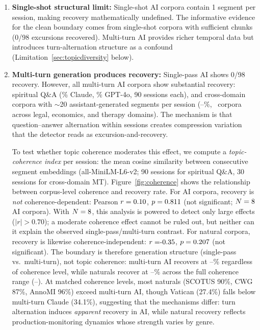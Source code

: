 \documentclass[11pt]{article}
\begin{document}
\begin{enumerate}

\item \textbf{Single-shot structural limit:} Single-shot AI corpora contain 1 segment per session, making recovery mathematically undefined. The informative evidence for the clean boundary comes from single-shot corpora with sufficient chunks (0/98 excursions recovered). Multi-turn AI provides richer temporal data but introduces turn-alternation structure as a confound (Limitation~\ref{sec:topicdiversity} below).

\item \textbf{Multi-turn generation produces recovery:} \label{sec:topicdiversity} Single-pass AI shows 0/98 recovery. However, all multi-turn AI corpora show substantial recovery: spiritual Q\&A (\recClaudeMT\% Claude, \recGPTMT\% GPT-4o, 90 sessions each), and cross-domain corpora with $\sim$20 assistant-generated segments per session (\recMTXdomMin--\recMTXdomMax\%, \nMTXdom\ corpora across legal, economics, and therapy domains). The mechanism is that question--answer alternation within sessions creates compression variation that the detector reads as excursion-and-recovery.

\label{sec:coherence-limitation} To test whether topic coherence moderates this effect, we compute a \textit{topic-coherence index} per session: the mean cosine similarity between consecutive segment embeddings (all-MiniLM-L6-v2; 90 sessions for spiritual Q\&A, 30 sessions for cross-domain MT). Figure~\ref{fig:coherence} shows the relationship between corpus-level coherence and recovery rate. For AI corpora, recovery is \textit{not} coherence-dependent: Pearson $r = 0.10$, $p = 0.811{}$ (not significant; $N = 8$ AI corpora). With $N = 8$, this analysis is powered to detect only large effects ($|r| > 0.70$); a moderate coherence effect cannot be ruled out, but neither can it explain the observed single-pass/multi-turn contrast. For natural corpora, recovery is likewise coherence-independent: $r = \cohNatr$, $p = 0.207$ (not significant). The boundary is therefore generation structure (single-pass vs.\ multi-turn), not topic coherence: multi-turn AI recovers at \recClaudeMT--\recGPTMT\% regardless of coherence level, while naturals recover at \recNatMin--\recNatMax\% across the full coherence range (\cohNatMin--\cohNatMax). At matched coherence levels, most naturals (SCOTUS 90\%, CWG 87\%, AnnoMI 96\%) exceed multi-turn AI, though Vatican (27.4\%) falls below multi-turn Claude (34.1\%), suggesting that the mechanisms differ: turn alternation induces \textit{apparent} recovery in AI, while natural recovery reflects production-monitoring dynamics whose strength varies by genre.


\end{enumerate}
\end{document}
